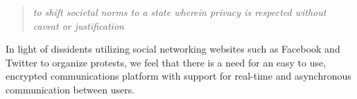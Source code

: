 \begin{quote}
\centering
\textit{to shift societal norms to a state wherein privacy is respected without
caveat or justification}
\end{quote}

In light of dissidents utilizing social networking websites such as Facebook and
Twitter to organize protests, we feel that there is a need for an easy to use,
encrypted communications platform with support for real-time and asynchronous
communication between users.
